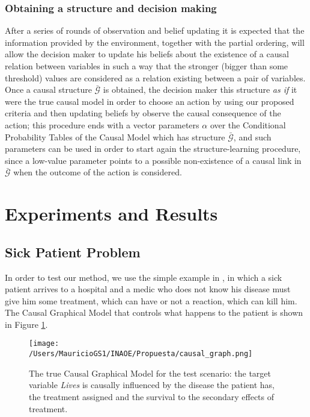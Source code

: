 \documentclass[letterpaper]{article}
\begin{document}
\subsubsection{Obtaining a structure and decision making}
After a series of rounds of observation and belief updating it is expected that the information provided by the environment, together with the partial ordering, will allow the decision maker to update his beliefs about the existence of a causal relation between variables in such a way that the stronger (bigger than some threshold) values are considered as a relation existing between a pair of variables. Once a causal structure $\bar{\mathcal{G}}$ is obtained, the decision maker this structure \textit{as if} it were the true causal model in order to choose an action by using our proposed criteria and then updating beliefs by observe the causal consequence of the action; this procedure ends with a vector parameters $\alpha$ over the Conditional Probability Tables of the Causal Model which has structure $\bar{\mathcal{G}}$, and such parameters can be used in order to start again the structure-learning procedure, since a low-value parameter points to a possible non-existence of a causal link in $\bar{\mathcal{G}}$ when the outcome of the action is considered.

\section{Experiments and Results}
\subsection{Sick Patient Problem}
In order to test our method, we use the simple example in \cite{gonzalez2018playing}, in which a sick patient arrives to a hospital and a medic who does not know his disease must give him some treatment, which can have or not a reaction, which can kill him. The Causal Graphical Model that controls what happens to the patient is shown in Figure \ref{causal_model}.

\begin{figure}[ht]
\vskip 0.2in
\begin{center}
\centerline{\texttt{[image: /Users/MauricioGS1/INAOE/Propuesta/causal\_graph.png]}}
\caption{The true Causal Graphical Model for the test scenario: the target variable \textit{Lives} is causally influenced by the disease the patient has, the treatment assigned and the survival to the secondary effects of treatment.}
\label{causal_model}
\end{center}
\vskip -0.2in
\end{figure}
\end{document}
